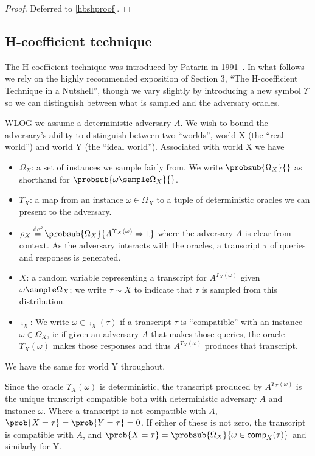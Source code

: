 \documentclass[eprint.tex]{subfiles}
\begin{document}
\begin{proof}Deferred to \autoref{hbshproof}.\renewcommand{\qedsymbol}{}
\end{proof}

\subsection{H-coefficient technique}
The H-coefficient technique was introduced by Patarin in 1991~\cite{ppdes,hco}.
In what follows we rely on the highly recommended exposition of
\cite{hco2} Section 3,
``The H-coefficient Technique in a Nutshell'', though we vary slightly by introducing
a new symbol $\Upsilon$ so we can distinguish between what is sampled and the adversary oracles.

WLOG we assume a deterministic adversary $A$.
We wish to bound the adversary's ability to distinguish between
two ``worlds'', world X (the ``real world'') and world Y (the ``ideal world'').
Associated with world X we have
\begin{itemize}
    \item $\Omega_X$: a set of instances we sample fairly from. We write
    $\probsub{\Omega_X}{}$ as shorthand for $\probsub{\omega \sample \Omega_X}{}$.
    \item $\Upsilon_X$: a map from an instance $\omega \in \Omega_X$ to a tuple of
    deterministic oracles we can present to the adversary.
    \item $\rho_X \defeq \probsub{\Omega_X}{A^{\Upsilon_X(\omega)} \Rightarrow 1}$
    where the adversary $A$ is clear from context.
    As the adversary interacts with the oracles, a transcript $\tau$
    of queries and responses is generated.
    \item $X$: a random variable representing a transcript for $A^{\Upsilon_X(\omega)}$
    given $\omega \sample \Omega_X$; we write $\tau \sim X$
    to indicate that $\tau$ is sampled from this distribution.
    \item $\comp_X$:  We write $\omega \in \comp_X(\tau)$
    if a transcript $\tau$ is ``compatible'' with an instance $\omega \in \Omega_X$,
    ie if given an adversary $A$ that makes those queries, the oracle $\Upsilon_X(\omega)$
    makes those responses and thus $A^{\Upsilon_X(\omega)}$ produces that transcript.
\end{itemize}
We have the same for world Y throughout.

Since the oracle $\Upsilon_X(\omega)$ is deterministic,
the transcript produced by $A^{\Upsilon_X(\omega)}$ is the unique transcript
compatible both with deterministic adversary $A$ and instance $\omega$. Where a transcript
is not compatible with $A$, $\prob{X = \tau} = \prob{Y = \tau} = 0$. If either
of these is not zero, the transcript is compatible with $A$, and
$\prob{X = \tau} = \probsub{\Omega_X}{\omega \in \comp_X(\tau)}$ and similarly for Y.
\end{document}
